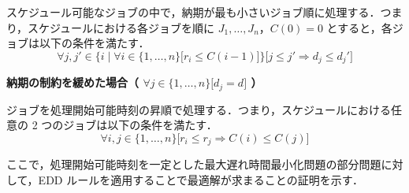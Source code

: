 \documentclass[12pt]{optlab-bachelor}
\begin{document}
スケジュール可能なジョブの中で，納期が最も小さいジョブ順に処理する．つまり，スケジュールにおける各ジョブを順に $J_1,\ldots,J_n$，$C(0) = 0$ とすると，各ジョブは以下の条件を満たす．
$$\forall j, j' \in \bigg\{i \mid \forall i \in \{1,\ldots,n\}\big[r_i \le C(i - 1)\big]\bigg\}\bigg[j \le j' \Rightarrow d_j \le d_j'\bigg]$$

\noindent\textbf{納期の制約を緩めた場合（ $\forall j \in \{1,\ldots,n\}\big[ d_j = d \big]$ ）}

ジョブを処理開始可能時刻の昇順で処理する．つまり，スケジュールにおける任意の 2 つのジョブは以下の条件を満たす．
$$\forall i, j \in \{1,\ldots,n\}\big[r_i \le r_j \Rightarrow C(i) \le C(j)\big]$$

ここで，処理開始可能時刻を一定とした最大遅れ時間最小化問題の部分問題に対して，EDD ルールを適用することで最適解が求まることの証明を示す．
\end{document}
